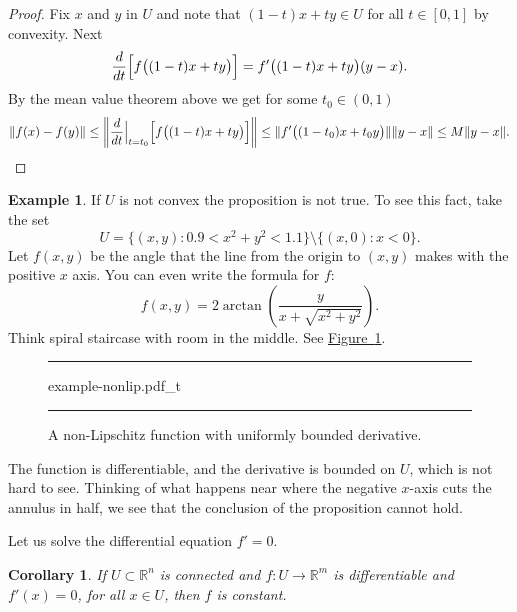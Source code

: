 \documentclass[12pt]{book}
\newenvironment{myfigureht}{%
\begin{figure}[h!t]
\noindent\rule{\textwidth}{0.4pt}\vspace{12pt}\par\centering}%
{\par\noindent\rule{\textwidth}{0.4pt}
\end{figure}}
\newcommand{\snorm}[1]{\lVert {#1} \rVert}
\newcommand{\norm}[1]{\left\lVert {#1} \right\rVert}
\newcommand{\R}{{\mathbb{R}}}
\theoremstyle{plain}
\newtheorem{cor}[thm]{Corollary}
\theoremstyle{remark}
\theoremstyle{definition}
\theoremstyle{exercise}
\theoremstyle{example}
\newtheorem{example}[thm]{Example}
\newcommand{\figureref}[1]{\hyperref[#1]{Figure~\ref*{#1}}}
\begin{document}
\begin{proof}
Fix $x$ and $y$ in $U$ and note that
$(1-t)x+ty \in U$ for all $t \in [0,1]$
by convexity.
Next
\begin{equation*}
\frac{d}{dt} \Bigl[f\bigl((1-t)x+ty\bigr)\Bigr]
=
f'\bigl((1-t)x+ty\bigr) (y-x) .
\end{equation*}
By the mean value theorem above we get for
some $t_0 \in (0,1)$
\begin{equation*}
\snorm{f(x)-f(y)} \leq
\norm{\frac{d}{dt} \Big|_{t=t_0} \Bigl[ f\bigl((1-t)x+ty\bigr) \Bigr] } \leq
\snorm{f'\bigl((1-t_0)x+t_0y\bigr)} \snorm{y-x} \leq
M \snorm{y-x} . \qedhere
\end{equation*}
\end{proof}

\begin{example}
If $U$ is not convex the proposition is not true.  To see this fact, take
the set
\begin{equation*}
U = \{ (x,y) : 0.9 < x^2+y^2 < 1.1 \} \setminus \{ (x,0) : x < 0 \} .
\end{equation*}
Let $f(x,y)$ be the angle that the line from the origin to $(x,y)$
makes with the positive $x$ axis.  You can even write the formula for $f$:
\begin{equation*}
f(x,y) = 2 \operatorname{arctan}\left( \frac{y}{x+\sqrt{x^2+y^2}}\right) .
\end{equation*}
Think spiral staircase with room in the middle.  See
\figureref{mv:fignonlip}.

\begin{myfigureht}
{example-nonlip.pdf_t}
\caption{A non-Lipschitz function with uniformly bounded
derivative.\label{mv:fignonlip}}
\end{myfigureht}

The function is differentiable,
and the derivative is bounded on $U$, which is not hard to see.   Thinking of
what happens near where the negative $x$-axis cuts the annulus in half,
we see that the conclusion of the proposition cannot hold.
\end{example}

Let us solve the differential equation $f' = 0$.

\begin{cor}
If $U \subset \R^n$ is connected and $f \colon U \to \R^m$ is differentiable
and $f'(x) = 0$, for all $x \in U$, then $f$ is constant.
\end{cor}
\end{document}
